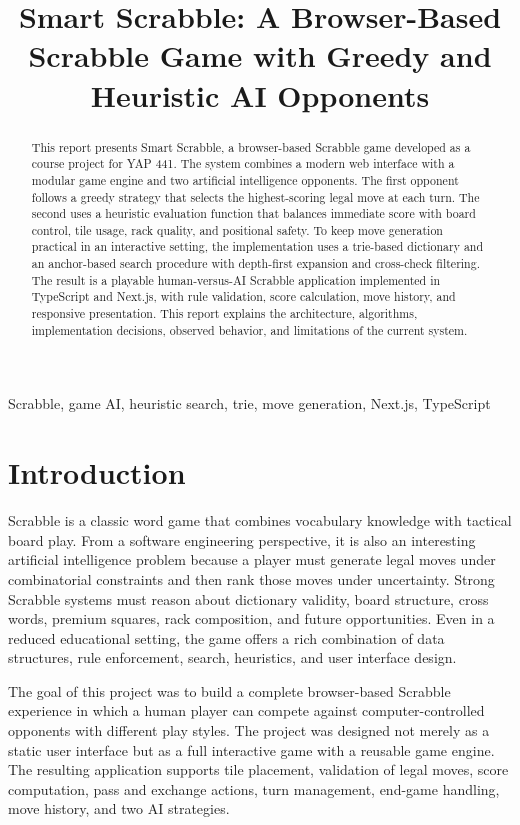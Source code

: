 \documentclass[conference]{IEEEtran}
\title{Smart Scrabble: A Browser-Based Scrabble Game with Greedy and Heuristic AI Opponents}
\author{
\IEEEauthorblockN{Iclal Suzan}
\IEEEauthorblockA{
Department of Computer Engineering\\
TOBB University of Economics and Technology\\
Ankara, Turkiye\\
211401020}
}
\begin{document}
\maketitle

\begin{abstract}
This report presents Smart Scrabble, a browser-based Scrabble game developed as a course project for YAP 441. The system combines a modern web interface with a modular game engine and two artificial intelligence opponents. The first opponent follows a greedy strategy that selects the highest-scoring legal move at each turn. The second uses a heuristic evaluation function that balances immediate score with board control, tile usage, rack quality, and positional safety. To keep move generation practical in an interactive setting, the implementation uses a trie-based dictionary and an anchor-based search procedure with depth-first expansion and cross-check filtering. The result is a playable human-versus-AI Scrabble application implemented in TypeScript and Next.js, with rule validation, score calculation, move history, and responsive presentation. This report explains the architecture, algorithms, implementation decisions, observed behavior, and limitations of the current system.
\end{abstract}

\begin{IEEEkeywords}
Scrabble, game AI, heuristic search, trie, move generation, Next.js, TypeScript
\end{IEEEkeywords}

\section{Introduction}
Scrabble is a classic word game that combines vocabulary knowledge with tactical board play. From a software engineering perspective, it is also an interesting artificial intelligence problem because a player must generate legal moves under combinatorial constraints and then rank those moves under uncertainty. Strong Scrabble systems must reason about dictionary validity, board structure, cross words, premium squares, rack composition, and future opportunities. Even in a reduced educational setting, the game offers a rich combination of data structures, rule enforcement, search, heuristics, and user interface design.

The goal of this project was to build a complete browser-based Scrabble experience in which a human player can compete against computer-controlled opponents with different play styles. The project was designed not merely as a static user interface but as a full interactive game with a reusable game engine. The resulting application supports tile placement, validation of legal moves, score computation, pass and exchange actions, turn management, end-game handling, move history, and two AI strategies.
\end{document}
